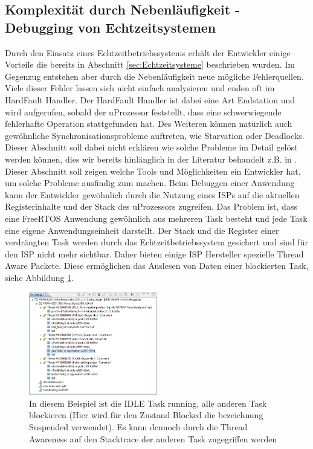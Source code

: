 \subsection{Komplexität durch Nebenläufigkeit - Debugging von Echtzeitsystemen}
\label{sec:Debugging von Echtzeitsystemen}
Durch den Einsatz eines Echtzeitbetriebssystems erhält der Entwickler einige Vorteile die bereits in Abschnitt \ref{sec:Echtzeitsysteme} beschrieben wurden. Im Gegenzug entstehen aber durch die Nebenläufigkeit neue mögliche Fehlerquellen. Viele dieser Fehler lassen sich nicht einfach analysieren und enden oft im HardFault Handler. Der HardFault Handler ist dabei eine Art Endstation und wird aufgerufen, sobald der uProzessor feststellt, dass eine schwerwiegende fehlerhafte Operation stattgefunden hat. Des Weiteren können na\-tür\-lich auch gewöhnliche Synchronisationsprobleme auftreten, wie Starvation oder Deadlocks. Dieser Abschnitt soll dabei nicht erklären wie solche Probleme im Detail gelöst werden können, dies wir bereits hinlänglich in der Literatur behandelt z.B. in \cite{9783827373427} \cite{9783864902222}. Dieser Abschnitt soll zeigen welche Tools und Möglichkeiten ein Entwickler hat, um solche Probleme ausfindig zum machen. Beim Debuggen einer Anwendung kann der Entwickler gewöhnlich durch die Nutzung eines ISPs auf die aktuellen Registerinhalte und der Stack des uProzessors zugreifen. Das Problem ist, dass eine FreeRTOS Anwendung gewöhnlich aus mehreren Task besteht und jede Task eine eigene Anwendungseinheit darstellt. Der Stack und die Register einer verdrängten Task werden durch das Echtzeitbetriebssystem gesichert und sind für den ISP nicht mehr sichtbar. Daher bieten einige ISP Hersteller spezielle Thread Aware Packete. Diese ermöglichen das Auslesen von Daten einer blockierten Task, siehe Abbildung \ref{fig:ThreadAware}.
\begin{figure}[!htb]
	\centering
		\includegraphics[width=0.5\textwidth]{Pictures/Segger/freertosThreadAwareness}
	\caption{In diesem Beispiel ist die IDLE Task running, alle anderen Task blockieren (Hier wird für den Zustand Blocked die bezeichnung Suspended verwendet). Es kann dennoch durch die Thread Awareness auf den Stacktrace der anderen Task zugegriffen werden }
	\label{fig:ThreadAware}
\end{figure}
